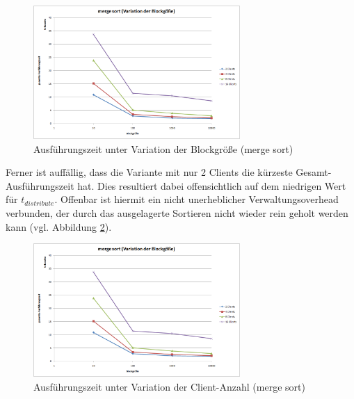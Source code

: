\documentclass[fontsize=12pt,a4paper,headinclude=no,headings=small]{scrartcl}
\begin{document}
\begin{figure}[H]
	\centering
	\includegraphics[width=0.7\textwidth]{results/sort/diagrams/block_ms.png}
	\caption{Ausführungszeit unter Variation der Blockgröße (merge sort)}
	\label{fig.ms.compare.blocksize}
\end{figure}
 
Ferner ist auffällig, dass die Variante mit nur 2 Clients die kürzeste Gesamt-Ausführungszeit hat. Dies resultiert dabei offensichtlich auf dem niedrigen Wert für $t_{distribute}$. Offenbar ist hiermit ein nicht unerheblicher Verwaltungsoverhead verbunden, der durch das ausgelagerte Sortieren nicht wieder rein geholt werden kann (vgl. Abbildung \ref{fig.ms.compare.clientcount}).

\begin{figure}[H]
	\centering
	\includegraphics[width=0.7\textwidth]{results/sort/diagrams/block_ms.png}
	\caption{Ausführungszeit unter Variation der Client-Anzahl (merge sort)}
	\label{fig.ms.compare.clientcount}
\end{figure}
\end{document}
